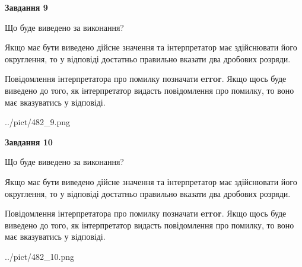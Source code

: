\documentclass[12pt, ukrainian]{article}
\begin{document}
{\begin {Large}
{\begin {center}\textbf{Завдання 9}\end {center}}\par
Що буде виведено за виконання? \par

Якщо має бути виведено дійсне значення та інтерпретатор має здійснювати його округлення, 
то у відповіді достатньо правильно вказати два дробових розряди.

Повідомлення інтерпретатора про помилку позначати \textbf{error}.
Якщо щось буде виведено до того, як інтерпретатор видасть повідомлення про помилку, 
то воно має вказуватись у відповіді. \par

\begin{center}
	{../pict/482_9.png}
\end{center}
\newpage

{\begin {center}\textbf{Завдання 10}\end {center}}\par
Що буде виведено за виконання? \par

Якщо має бути виведено дійсне значення та інтерпретатор має здійснювати його округлення, 
то у відповіді достатньо правильно вказати два дробових розряди.

Повідомлення інтерпретатора про помилку позначати \textbf{error}.
Якщо щось буде виведено до того, як інтерпретатор видасть повідомлення про помилку, 
то воно має вказуватись у відповіді. \par

\begin{center}
	{../pict/482_10.png}
\end{center}
\newpage

\end {Large}}
\end{document}
